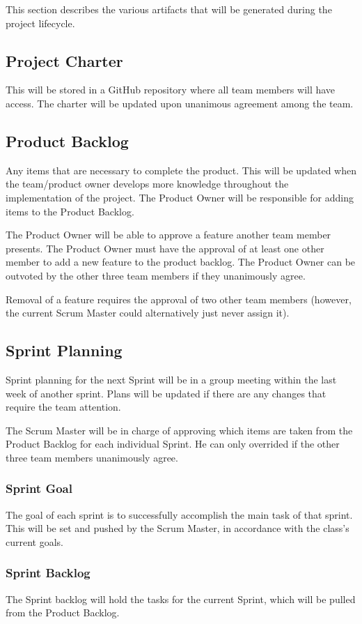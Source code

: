 This section describes the various artifacts that will be generated during the project lifecycle. 

\subsection{Project Charter}
This will be stored in a GitHub repository where all team members will have access.
The charter will be updated upon unanimous agreement among the team.

\subsection{Product Backlog}
Any items that are necessary to complete the product. This will be updated when the team/product owner develops more knowledge throughout the implementation of the project. The Product Owner will be responsible for adding items to the Product Backlog. 

The Product Owner will be able to approve a feature another team member presents. The Product Owner must have the approval of at least one other member to add a new feature to the product backlog. The Product Owner can be outvoted by the other three team members if they unanimously agree.  

Removal of a feature requires the approval of two other team members (however, the current Scrum Master could alternatively just never assign it).

\subsection{Sprint Planning}
Sprint planning for the next Sprint will be in a group meeting within the last week of another sprint. Plans will be updated if there are any changes that require the team attention.

The Scrum Master will be in charge of approving which items are taken from the Product Backlog for each individual Sprint. He can only overrided if the other three team members unanimously agree.

\subsubsection{Sprint Goal}
The goal of each sprint is to successfully accomplish the main task of that sprint. This will be set and pushed by the Scrum Master, in accordance with the class's current goals.

\subsubsection{Sprint Backlog}
The Sprint backlog will hold the tasks for the current Sprint, which will be pulled from the Product Backlog. 

